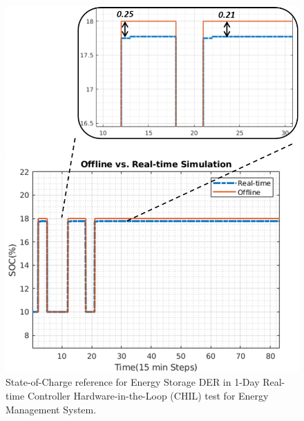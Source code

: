 \begin{figure}[!ht]
    \centering
    \includegraphics[width = 0.7\linewidth]{figs_juan/realtime.png}
    \caption{State-of-Charge reference for Energy Storage DER in 1-Day Real-time Controller Hardware-in-the-Loop (CHIL) test for Energy Management System.}
    \label{fig:realtime}
\end{figure}

